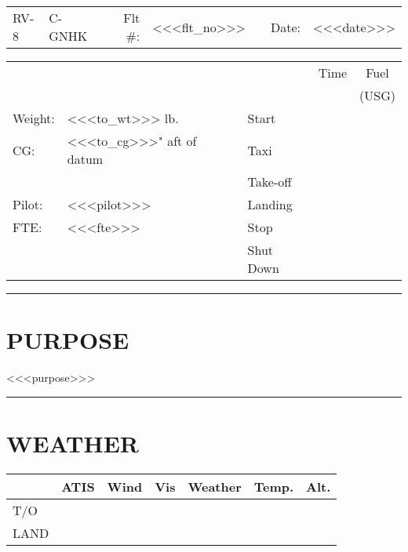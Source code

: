 \documentclass[14pt,halfparskip]{scrartcl}
\newlength{\colOne}
\newlength{\colTwo}
\newlength{\colThree}
\newlength{\colFour}
\newlength{\colSix}
\newlength{\colSeven}
\begin{document}

\noindent\begin{tabularx}{\linewidth - 10 pt}{llXrlXrl}
  RV-8&C-GNHK&&Flt \#:&<<<flt_no>>>&&Date:&<<<date>>>
  \end{tabularx}
  
\noindent\begin{tabularx}{\linewidth - 10 pt}{llX|l|c|c|}
  \cline{4-6}
  &&&&Time&Fuel\\
  &&&&&(USG)\\
  \cline{4-6}
  Weight:&<<<to_wt>>> lb.&&Start&&\\
  \cline{4-6}
  CG:&<<<to_cg>>>" aft of datum&&Taxi&&\\
  \cline{4-6}
  &&&Take-off&&\\
  \cline{4-6}
  Pilot:&<<<pilot>>>&&Landing&&\\
  \cline{4-6}
  FTE:&<<<fte>>>&&Stop&&\\
  \cline{4-6}
  &&&Shut Down&&\\
  \cline{4-6}
  \end{tabularx}

\noindent\rule{\linewidth}{1mm}
 \section*{PURPOSE}
    <<<purpose>>>
  
\noindent\rule{\linewidth}{1mm}
\section*{WEATHER}
\settowidth{}
\settowidth{}
\settowidth{}
\settowidth{}
\settowidth{}
\settowidth{}
\noindent\begin{tabularx}{\linewidth - 10 pt}{|p{\colOne}|p{\colTwo}|p{\colThree}|p{\colFour}|X|p{\colSix}|p{\colSeven}|}
  \hline
  &ATIS&Wind&Vis&Weather&Temp.&Alt.\\
  \hline
  \hline
  T/O&&&&&&\\
  \hline
  LAND&&&&&&\\
  \hline
  \end{tabularx}
  
\end{document}
